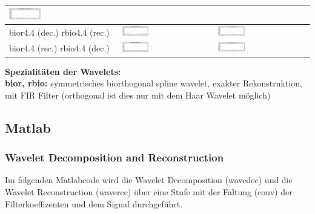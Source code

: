 \begin{center}
\begin{tabular}{L{0.15\textwidth}||m{0.3\textwidth}|m{0.3\textwidth}}
		\includegraphics[width=0.3\textwidth]{content/Bior22PsiRec.png} \\
		\hline
		bior4.4 (dec.) \newline rbio4.4 (rec.) & 
		\includegraphics[width=0.3\textwidth]{content/Bior44PhiDec.png} &
		\includegraphics[width=0.3\textwidth]{content/Bior44PsiDec.png} \\
		bior4.4 (rec.) \newline rbio4.4 (dec.) & 
		\includegraphics[width=0.3\textwidth]{content/Bior44PhiRec.png} &
		\includegraphics[width=0.3\textwidth]{content/Bior44PsiRec.png} \\
	\end{tabular}
\end{center}

\textbf{Spezialitäten der Wavelets:}\\
\textbf{bior, rbio:} symmetrisches biorthogonal spline wavelet, exakter Rekonstruktion, mit FIR Filter (orthogonal ist dies nur mit dem Haar Wavelet möglich)





\newpage
\subsection{Matlab} 

\subsubsection{Wavelet Decomposition and Reconstruction}
Im folgenden Matlabcode wird die Wavelet Decomposition (wavedec) und die Wavelet Reconstruction (waverec) über eine Stufe mit der Faltung (conv) der Filterkoeffizenten und dem Signal durchgeführt.




